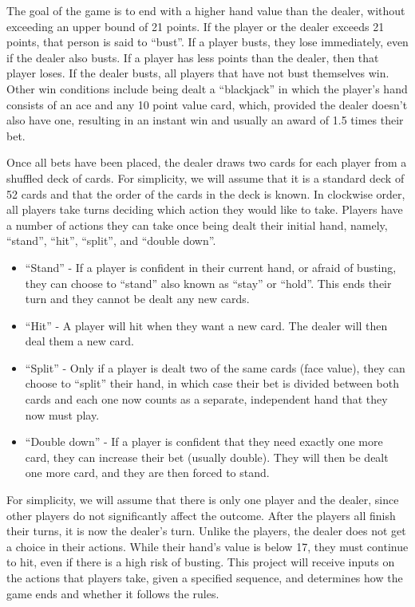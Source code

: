 \documentclass{article}
\begin{document}
The goal of the game is to end with a higher hand value than the dealer, without exceeding an upper bound of 21 points.
If the player or the dealer exceeds 21 points, that person is said to ``bust''.
If a player busts, they lose immediately, even if the dealer also busts.
If a player has less points than the dealer, then that player loses.
If the dealer busts, all players that have not bust themselves win.
Other win conditions include being dealt a ``blackjack'' in which the player's hand consists of an ace and any 10 point value card, which, provided the dealer doesn't also have one, resulting in an instant win and usually an award of 1.5 times their bet.

Once all bets have been placed, the dealer draws two cards for each player from a shuffled deck of cards.
For simplicity, we will assume that it is a standard deck of 52 cards and that the order of the cards in the deck is known.
In clockwise order, all players take turns deciding which action they would like to take.
Players have a number of actions they can take once being dealt their initial hand, namely, ``stand'', ``hit'', ``split'', and ``double down''.
\begin{itemize}
    \item ``Stand'' - If a player is confident in their current hand, or afraid of busting, they can choose to ``stand'' also known as ``stay'' or ``hold''.
        This ends their turn and they cannot be dealt any new cards.

    \item ``Hit'' - A player will hit when they want a new card.
        The dealer will then deal them a new card.

    \item ``Split'' - Only if a player is dealt two of the same cards (face value), they can choose to ``split'' their hand, in which case their bet is divided between both cards and each one now counts as a separate, independent hand that they now must play.

    \item ``Double down'' - If a player is confident that they need exactly one more card, they can increase their bet (usually double).
        They will then be dealt one more card, and they are then forced to stand.
\end{itemize}

For simplicity, we will assume that there is only one player and the dealer, since other players do not significantly affect the outcome.
After the players all finish their turns, it is now the dealer's turn.
Unlike the players, the dealer does not get a choice in their actions.
While their hand's value is below 17, they must continue to hit, even if there is a high risk of busting.
This project will receive inputs on the actions that players take, given a specified sequence, and determines how the game ends and whether it follows the rules.
\end{document}
